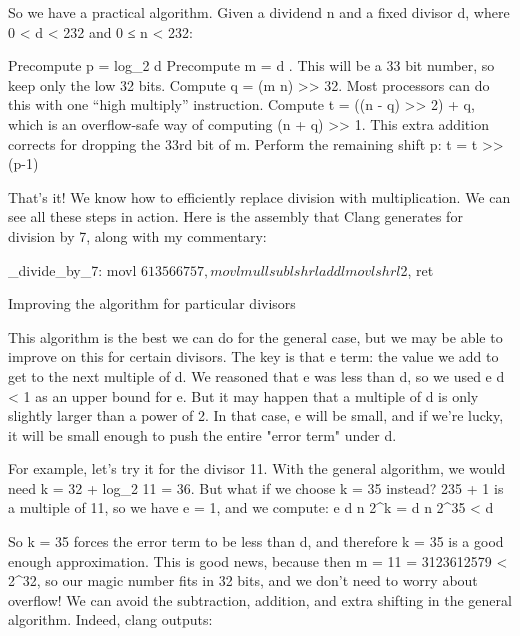 So we have a practical algorithm. Given a dividend n and a fixed divisor d, where 0 < d < 232 and 0 ≤ n < 232:

    Precompute p = \lceil log_2 d \rceil
    Precompute m = \lceil {} d \rceil. This will be a 33 bit number, so keep only the low 32 bits.
    Compute q = (m \times n) >> 32. Most processors can do this with one “high multiply” instruction.
    Compute t = ((n - q) >> 2) + q, which is an overflow-safe way of computing (n + q) >> 1. This extra addition corrects for dropping the 33rd bit of m.
    Perform the remaining shift p: t = t >> (p-1)

That’s it! We know how to efficiently replace division with multiplication. We can see all these steps in action. Here is the assembly that Clang generates for division by 7, along with my commentary:

_divide_by_7:
 movl $613566757, %
 movl %
 mull %
 subl %
 shrl %
 addl %
 movl %
 shrl $2, %
 ret

 
Improving the algorithm for particular divisors

This algorithm is the best we can do for the general case, but we may be able to improve on this for certain divisors. The key is that e term: the value we add to get to the next multiple of d. We reasoned that e was less than d, so we used \frac e d < 1 as an upper bound for e. But it may happen that a multiple of d is only slightly larger than a power of 2. In that case, e will be small, and if we're lucky, it will be small enough to push the entire "error term" under  d.

For example, let’s try it for the divisor 11. With the general algorithm, we would need k = 32 + \lceil log_2 11 \rceil = 36. But what if we choose k = 35 instead? 235 + 1 is a multiple of 11, so we have e = 1, and we compute:
\frac e d \times \frac n {2^k} =  d \times \frac n {2^{35}} <  d

So k = 35 forces the error term to be less than  d, and therefore k = 35 is a good enough approximation. This is good news, because then m = \lceil {} {11} \rceil = 3123612579 < 2^{32}, so our magic number fits in 32 bits, and we don't need to worry about overflow! We can avoid the subtraction, addition, and extra shifting in the general algorithm. Indeed, clang outputs:

